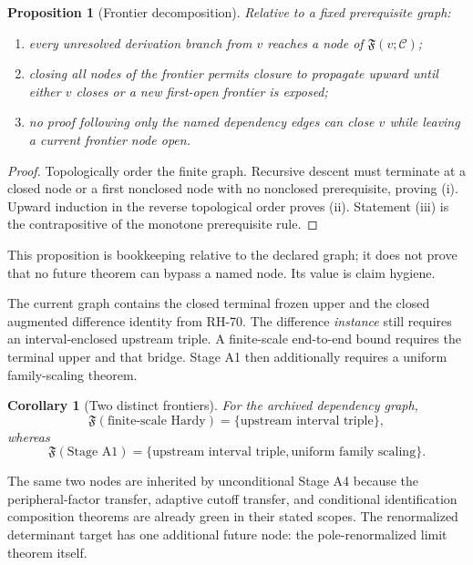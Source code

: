 \documentclass[11pt]{article}
\newtheorem{proposition}[theorem]{Proposition}
\newtheorem{corollary}[theorem]{Corollary}
\theoremstyle{definition}
\begin{document}
\begin{proposition}[Frontier decomposition]
\label{prop:frontier}
Relative to a fixed prerequisite graph:
\begin{enumerate}[label=(\roman*),leftmargin=2.2em]
 \item every unresolved derivation branch from $v$ reaches a node of
       $\mathfrak F(v;\mathcal C)$;
 \item closing all nodes of the frontier permits closure to propagate upward
       until either $v$ closes or a new first-open frontier is exposed;
 \item no proof following only the named dependency edges can close $v$
       while leaving a current frontier node open.
\end{enumerate}
\end{proposition}

\begin{proof}
Topologically order the finite graph.  Recursive descent must terminate at a
closed node or a first nonclosed node with no nonclosed prerequisite, proving
(i).  Upward induction in the reverse topological order proves (ii).
Statement (iii) is the contrapositive of the monotone prerequisite rule.
\end{proof}

This proposition is bookkeeping relative to the declared graph; it does not
prove that no future theorem can bypass a named node.  Its value is claim
hygiene.

The current graph contains the closed terminal frozen upper and the closed
augmented difference identity from RH-70.  The difference \emph{instance}
still requires an interval-enclosed upstream triple.  A finite-scale
end-to-end bound requires the terminal upper and that bridge.  Stage A1 then
additionally requires a uniform family-scaling theorem.

\begin{corollary}[Two distinct frontiers]
\label{cor:two-frontiers}
For the archived dependency graph,
\[
 \mathfrak F(\text{finite-scale Hardy})
 =\{\text{upstream interval triple}\},
\]
whereas
\[
 \mathfrak F(\text{Stage A1})
 =\{
 \text{upstream interval triple},
 \text{uniform family scaling}
 \}.
\]
\end{corollary}

The same two nodes are inherited by unconditional Stage A4 because the
peripheral-factor transfer, adaptive cutoff transfer, and conditional
identification composition theorems are already green in their stated
scopes.  The renormalized determinant target has one additional future node:
the pole-renormalized limit theorem itself.
\end{document}
